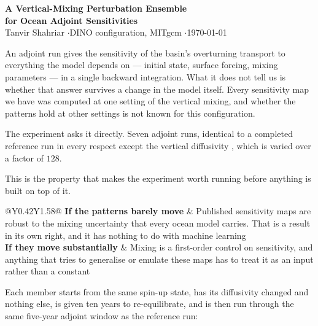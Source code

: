 \begin{center}
{\large\bfseries A Vertical-Mixing Perturbation Ensemble\\[2pt]
 for Ocean Adjoint Sensitivities}\\[3pt]
{\small Tanvir Shahriar \quad$\cdot$\quad DINO configuration, MITgcm
 \quad$\cdot$\quad \today}
\end{center}

An adjoint run gives the sensitivity of the basin's overturning transport to
everything the model depends on --- initial state, surface forcing, mixing
parameters --- in a single backward integration. What it does not tell us is
whether that answer survives a change in the model itself. Every sensitivity map
we have was computed at one setting of the vertical mixing, and whether the
patterns hold at other settings is not known for this configuration.

The experiment asks it directly. Seven adjoint runs, identical to a completed
reference run in every respect except the vertical diffusivity \kv, which is
varied over a factor of $128$.

This is the property that makes the experiment worth running before anything is
built on top of it.

\smallskip
\begin{tabularx}{\textwidth}{@{}Y{0.42}Y{1.58}@{}}
\toprule
\textbf{If the patterns barely move} & Published sensitivity maps are robust to
  the mixing uncertainty that every ocean model carries. That is a result in its
  own right, and it has nothing to do with machine learning\\
\textbf{If they move substantially} & Mixing is a first-order control on
  sensitivity, and anything that tries to generalise or emulate these maps has to
  treat it as an input rather than a constant\\
\bottomrule
\end{tabularx}

Each member starts from the same spin-up state, has its diffusivity changed and
nothing else, is given ten years to re-equilibrate, and is then run through the
same five-year adjoint window as the reference run:


